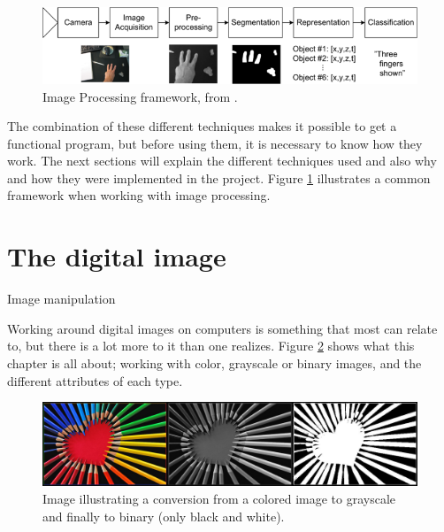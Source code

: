 \begin{figure}[htbp]
\centering
\includegraphics[width=1.00\textwidth]{Pictures/Theory/imageProcessing_steps.png}
\caption{Image Processing framework, from \citep{ip_book}.}
\label{fig:ip_framework}
\end{figure}


The combination of these different techniques makes it possible to get a functional program, but before using them, it is necessary to know how they work. The next sections will explain the different techniques used and also why and how they were implemented in the project. Figure \ref{fig:ip_framework} illustrates a common framework when working with image processing.

\section{The digital image}
Image manipulation 

Working around digital images on computers is something that most can relate to, but there is a lot more to it than one realizes. Figure \ref{fig:ip_ColoredToGrayscaleToBinary} shows what this chapter is all about; working with color, grayscale or binary images, and the different attributes of each type.

\begin{figure}[htbp]
\centering
\includegraphics[width=1.00\textwidth]{Pictures/Theory/ColoredToGrayscaleToBinary.jpg}
\caption{Image illustrating a conversion from a colored image to grayscale and finally to binary (only black and white).}
\label{fig:ip_ColoredToGrayscaleToBinary}
\end{figure}

